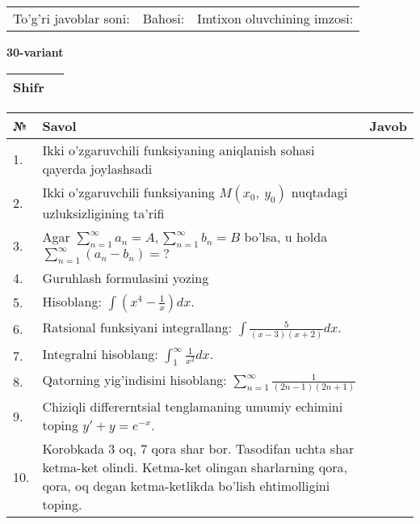 \documentclass{article}
\begin{document}
  \vspace{1cm}
  
  \begin{tabular}{lll}
  To'g'ri javoblar soni: \underline{\hspace{1.5cm}} & 
  Bahosi: \underline{\hspace{1.5cm}} & 
  Imtixon oluvchining imzosi: \underline{\hspace{2cm}} \\
  \end{tabular}
  
  \egroup
  
  \newpage
  
  
  \textbf{30-variant}\\
  
  \bgroup
  \def\arraystretch{1.6} %
  
  \begin{tabular}{|m{5.7cm}|m{9.5cm}|}
  \hline
  Shifr & \\
  \hline
  \end{tabular}
  
  \vspace{1cm}
  
  \begin{tabular}{|m{0.7cm}|m{10cm}|m{4cm}|}
  \hline
  № & Savol & Javob \\
  \hline
  1. & Ikki o'zgaruvchili funksiyaning aniqlanish sohasi qayerda joylashsadi &  \\
  \hline
  2. & Ikki o'zgaruvchili funksiyaning \(M(x_{0},\ y_{0})\) nuqtadagi uzluksizligining ta'rifi &  \\
  \hline
  3. & Agar \(\sum_{n = 1}^{\infty}a_{n} = A,\sum_{n = 1}^{\infty}b_{n} = B\) bo'lsa, u holda \(\sum_{n = 1}^{\infty}\left( a_{n} - b_{n} \right) = ?\) &  \\
  \hline
  4. & Guruhlash formulasini yozing &  \\
  \hline
  5. & Hisoblang: \(\int \left( x^{4} - \frac{1}{x} \right)dx\). &  \\
  \hline
  6. & Ratsional funksiyani integrallang: \(\int {\frac{5}{(x - 3)(x + 2)}dx}\). &  \\
  \hline
  7. & Integralni hisoblang: \(\int_{1}^{\infty}{\frac{1}{x^{2}}dx}\). &  \\
  \hline
  8. & Qatorning yig'indisini hisoblang: \(\sum_{n = 1}^{\infty}\frac{1}{(2n - 1)(2n + 1)}\) &  \\
  \hline
  9. & Chiziqli differerntsial tenglamaning umumiy echimini toping \(y' + y = e^{- x}\). &  \\
  \hline
  10. & Korobkada 3 oq, 7 qora shar bor. Tasodifan uchta shar ketma-ket olindi. Ketma-ket olingan sharlarning qora, qora, oq degan ketma-ketlikda bo'lish ehtimolligini toping. &  \\
  \hline
  \end{tabular}
  
\end{document}
